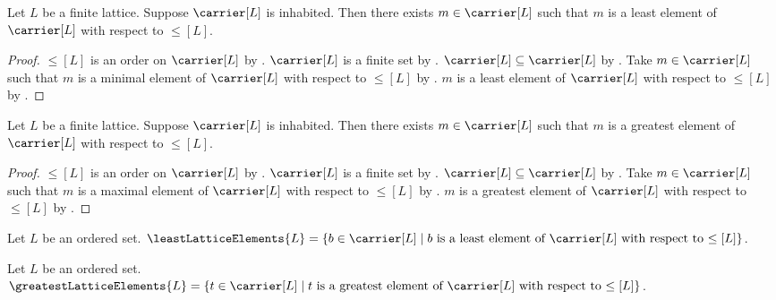 \begin{theorem}\label{finite_inhabited_lattice_has_least_element}
    Let $L$ be a finite lattice.
    Suppose $\carrier[L]$ is inhabited.
    Then there exists $m\in\carrier[L]$ such that
        $m$ is a least element of $\carrier[L]$ with respect to $\leq[L]$.
\end{theorem}
\begin{proof}
    $\leq[L]$ is an order on $\carrier[L]$ by
        .
    $\carrier[L]$ is a finite set by .
    $\carrier[L]\subseteq\carrier[L]$ by .
    Take $m\in\carrier[L]$ such that
        $m$ is a minimal element of $\carrier[L]$ with respect to $\leq[L]$
        by .
    $m$ is a least element of $\carrier[L]$ with respect to $\leq[L]$ by
        .
\end{proof}

\begin{theorem}\label{finite_inhabited_lattice_has_greatest_element}
    Let $L$ be a finite lattice.
    Suppose $\carrier[L]$ is inhabited.
    Then there exists $m\in\carrier[L]$ such that
        $m$ is a greatest element of $\carrier[L]$ with respect to $\leq[L]$.
\end{theorem}
\begin{proof}
    $\leq[L]$ is an order on $\carrier[L]$ by
        .
    $\carrier[L]$ is a finite set by .
    $\carrier[L]\subseteq\carrier[L]$ by .
    Take $m\in\carrier[L]$ such that
        $m$ is a maximal element of $\carrier[L]$ with respect to $\leq[L]$
        by .
    $m$ is a greatest element of $\carrier[L]$ with respect to $\leq[L]$ by
        .
\end{proof}

\begin{definition}\label{least_lattice_elements}
    Let $L$ be an ordered set.
    $\leastLatticeElements{L}
        =\{b\in\carrier[L]\mid
            \text{$b$ is a least element of $\carrier[L]$
                with respect to $\leq[L]$}\}$.
\end{definition}

\begin{definition}\label{greatest_lattice_elements}
    Let $L$ be an ordered set.
    $\greatestLatticeElements{L}
        =\{t\in\carrier[L]\mid
            \text{$t$ is a greatest element of $\carrier[L]$
                with respect to $\leq[L]$}\}$.
\end{definition}

